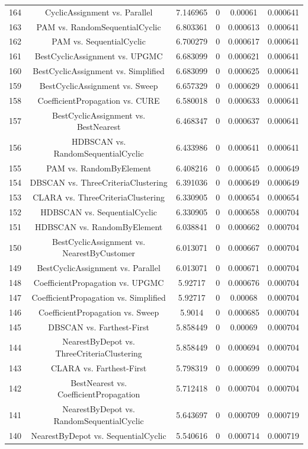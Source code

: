 \documentclass[a4paper,10pt]{article}
\begin{document}
\begin{landscape}
\begin{table}[!htp]
\begin{tabular}{cccccc}
164&CyclicAssignment vs. Parallel&7.146965&0&0.00061&0.000641\\
163&PAM vs. RandomSequentialCyclic&6.803361&0&0.000613&0.000641\\
162&PAM vs. SequentialCyclic&6.700279&0&0.000617&0.000641\\
161&BestCyclicAssignment vs. UPGMC&6.683099&0&0.000621&0.000641\\
160&BestCyclicAssignment vs. Simplified&6.683099&0&0.000625&0.000641\\
159&BestCyclicAssignment vs. Sweep&6.657329&0&0.000629&0.000641\\
158&CoefficientPropagation vs. CURE&6.580018&0&0.000633&0.000641\\
157&BestCyclicAssignment vs. BestNearest&6.468347&0&0.000637&0.000641\\
156&HDBSCAN vs. RandomSequentialCyclic&6.433986&0&0.000641&0.000641\\
155&PAM vs. RandomByElement&6.408216&0&0.000645&0.000649\\
154&DBSCAN vs. ThreeCriteriaClustering&6.391036&0&0.000649&0.000649\\
153&CLARA vs. ThreeCriteriaClustering&6.330905&0&0.000654&0.000654\\
152&HDBSCAN vs. SequentialCyclic&6.330905&0&0.000658&0.000704\\
151&HDBSCAN vs. RandomByElement&6.038841&0&0.000662&0.000704\\
150&BestCyclicAssignment vs. NearestByCustomer&6.013071&0&0.000667&0.000704\\
149&BestCyclicAssignment vs. Parallel&6.013071&0&0.000671&0.000704\\
148&CoefficientPropagation vs. UPGMC&5.92717&0&0.000676&0.000704\\
147&CoefficientPropagation vs. Simplified&5.92717&0&0.00068&0.000704\\
146&CoefficientPropagation vs. Sweep&5.9014&0&0.000685&0.000704\\
145&DBSCAN vs. Farthest-First&5.858449&0&0.00069&0.000704\\
144&NearestByDepot vs. ThreeCriteriaClustering&5.858449&0&0.000694&0.000704\\
143&CLARA vs. Farthest-First&5.798319&0&0.000699&0.000704\\
142&BestNearest vs. CoefficientPropagation&5.712418&0&0.000704&0.000704\\
141&NearestByDepot vs. RandomSequentialCyclic&5.643697&0&0.000709&0.000719\\
140&NearestByDepot vs. SequentialCyclic&5.540616&0&0.000714&0.000719\\

\end{tabular}
\end{table}
\end{landscape}
\end{document}
